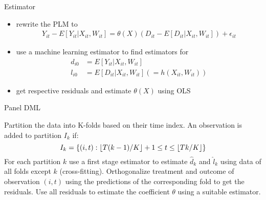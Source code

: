 \documentclass[a4paper, 12pt]{beamer}
\DeclarePairedDelimiter{\floor}{\lfloor}{\rfloor}
\begin{document}
\begin{frame}{Estimator}
  \begin{itemize}
    \item rewrite the PLM to 
    \begin{align*}
      Y_{it}-E[Y_{it}|X_{it}, W_{it}]=\theta(X)(D_{it}-E[D_{it}|X_{it}, W_{it}]) +\epsilon_{it}
    \end{align*}
    \item use a machine learning estimator to find estimators for
    \begin{align*}
      d_{i0}&=E[Y_{it}|X_{it}, W_{it}] \\
      l_{i0}&=E[D_{it}|X_{it}, W_{it}](=h(X_{it}, W_{it}))
    \end{align*}
    \item get respective residuals and estimate $\theta(X)$ using OLS
  \end{itemize}
\end{frame}

\begin{frame}{Panel DML}
  \begin{algorithm}[H]
    \caption{Panel DML Recipe}
    \begin{algorithmic}[1]
        \State Partition the data into K-folds based on their time index. An observation is added to partition $I_k$ if: 
                $$I_k=\{(i, t) : \floor{T(k-1)/K}+1 \leq t \leq \floor{Tk/K}\}$$ 
        \State For each partition $k$ use a first stage estimator to estimate $\hat{d}_k$ and $\hat{l}_k$ using data of all folds except $k$ (cross-fitting). 
        \State Orthogonalize treatment and outcome of observation $(i, t)$ using the predictions of the corresponding fold to get the residuals. 
        \State Use all residuals to estimate the coefficient $\theta$ using a suitable estimator.  
    \end{algorithmic}
  \end{algorithm}
\end{frame}
\end{document}
